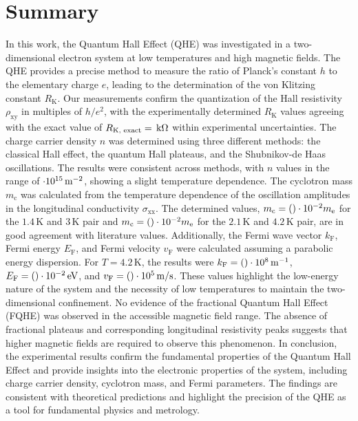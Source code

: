 \section{Summary}

In this work, the Quantum Hall Effect (QHE) was investigated in a two-dimensional electron system 
at low temperatures and high magnetic fields. 
The QHE provides a precise method to measure the ratio of Planck's constant $h$ to the elementary charge $e$,
leading to the determination of the von Klitzing constant $R_\text{K}$. Our measurements confirm the 
quantization of the Hall resistivity $\rho_\text{xy}$ in multiples of $h/e^2$, with the experimentally 
determined $R_\text{K}$ values agreeing with the exact value of $R_\text{K, exact} = \csname Klitzing1.4K\endcsname\,\text{k}\Omega$ 
within experimental uncertainties.
The charge carrier density $n$ was determined using three different methods: 
the classical Hall effect, the quantum Hall plateaus, and the Shubnikov-de Haas oscillations. 
The results were consistent across methods, with $n$ values in the range of $\csname nEins1.4K\endcsname \cdot 10^{15}\,\text{m}^{-2}$, 
showing a slight temperature dependence.
The cyclotron mass $m_\text{c}$ was calculated from the temperature dependence 
of the oscillation amplitudes in the longitudinal conductivity $\sigma_\text{xx}$. 
The determined values, $m_\text{c} = (\csname cyclotron15\endcsname)\cdot 10^{-2}m_\text{e}$ for the $1.4\,\text{K}$ and $3\,\text{K}$ 
pair and $m_\text{c} = (\csname cyclotron21\endcsname)\cdot 10^{-2}m_\text{e}$ for the $2.1\,\text{K}$ and $4.2\,\text{K}$ pair, 
are in good agreement with literature values.
Additionally, the Fermi wave vector $k_\text{F}$, Fermi energy $E_\text{F}$, and Fermi velocity $v_\text{F}$ 
were calculated assuming a parabolic energy dispersion. For $T = 4.2\,\text{K}$, 
the results were $k_\text{F} = (\csname kFermi4.2K\endcsname) \cdot 10^{8}\,\text{m}^{-1}$, $E_\text{F} = (\csname EFermi4.2K\endcsname)\cdot 10^{-2}\,\text{eV}$, 
and $v_\text{F} = (\csname vFermi4.2K\endcsname) \cdot 10^{5}\,\text{m/s}$. 
These values highlight the low-energy nature of the system and the necessity of 
low temperatures to maintain the two-dimensional confinement.
No evidence of the fractional Quantum Hall Effect (FQHE) was observed in the accessible magnetic field range. 
The absence of fractional plateaus and corresponding longitudinal resistivity peaks suggests that higher magnetic 
fields are required to observe this phenomenon.
In conclusion, the experimental results confirm the fundamental properties of the Quantum Hall Effect 
and provide insights into the electronic properties of the system, including charge carrier density, 
cyclotron mass, and Fermi parameters. The findings are consistent with theoretical predictions and 
highlight the precision of the QHE as a tool for fundamental physics and metrology.
